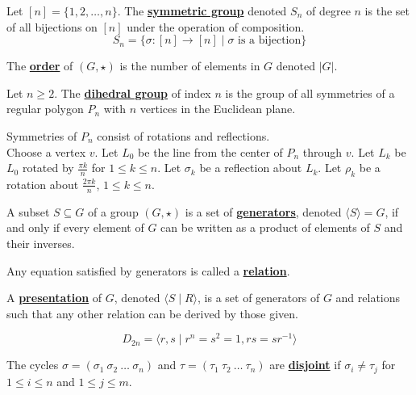\documentclass[11pt,letterpaper]{book}
\newcommand{\define}[1]{\underline{\textbf{#1}}}
\theoremstyle{definition}
\begin{document}
\begin{defi}
    Let $[n]=\{1,2,\ldots,n\}$. The \define{symmetric group} denoted $S_n$ of degree $n$ is the set of all bijections on $[n]$ under the operation of composition.
    $$S_n=\{\sigma:[n]\rightarrow[n]\mid\sigma\text{ is a bijection}\}$$
\end{defi}

\begin{defi}
    The \define{order} of $(G,\star)$ is the number of elements in $G$ denoted $|G|$.
\end{defi}

\begin{defi}
    Let $n\ge 2$. The \define{dihedral group} of index $n$ is the group of all symmetries of a regular polygon $P_n$ with $n$ vertices in the Euclidean plane.
\end{defi}

Symmetries of $P_n$ consist of rotations and reflections.\\

Choose a vertex $v$. Let $L_0$ be the line from the center of $P_n$ through $v$. Let $L_k$ be $L_0$ rotated by $\frac{\pi k}{n}$ for $1\le k\le n$. Let $\sigma_k$ be a reflection about $L_k$. Let $\rho_k$ be a rotation about $\frac{2\pi k}{n}$, $1\le k\le n$.

\begin{defi}
    A subset $S\subseteq G$ of a group $(G,\star)$ is a set of \define{generators}, denoted $\langle S\rangle=G$, if and only if every element of $G$ can be written as a product of elements of $S$ and their inverses.
\end{defi}

\begin{defi}
    Any equation satisfied by generators is called a \define{relation}.
\end{defi}

\begin{defi}
    A \define{presentation} of $G$, denoted $\langle S\mid R\rangle$, is a set of generators of $G$ and relations such that any other relation can be derived by those given.
\end{defi}

\begin{ex}
    $$D_{2n}=\langle r,s\mid r^n=s^2=1,rs=sr^{-1}\rangle$$
\end{ex}

\begin{defi}
    The cycles $\sigma=(\sigma_1\ \sigma_2\ \ldots\ \sigma_n)$ and $\tau=(\tau_1\ \tau_2\ \ldots\ \tau_n)$ are \define{disjoint} if $\sigma_i\ne\tau_j$ for $1\le i\le n$ and $1\le j\le m$.
\end{defi}
\end{document}
